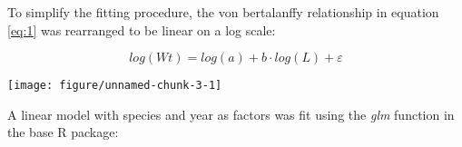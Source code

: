 \documentclass[12pt]{article}\usepackage[]{graphicx}\usepackage[]{color}
\makeatletter
\def\maxwidth{ %
  \ifdim\Gin@nat@width>\linewidth
    \linewidth
  \else
    \Gin@nat@width
  \fi
}
\newenvironment{knitrout}{}{} %
\makeatother
\begin{document}
To simplify the fitting procedure, the von bertalanffy relationship in equation
\ref{eq:1} was rearranged to be linear on a log scale:

\begin{equation}\label{eq:2}
	log(Wt) = log(a) + b \cdot log(L) + \varepsilon
\end{equation} 

\vspace{1cm}

\begin{knitrout}\footnotesize
{}\color{fgcolor}
\texttt{[image: figure/unnamed-chunk-3-1]} 

\end{knitrout}

A linear model with species and year as factors was fit using the \textit{glm}
function in the base R package:
\end{document}
